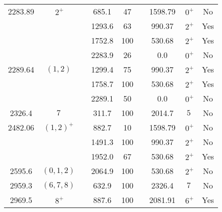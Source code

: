 \begin{tabular}{ccccccccc}
2283.89  & $~2^+$    &            &  685.1     &  47        &                  & 1598.79         & $~0^+$         & No                \\
         &           &            & 1293.6     &  63        &                  &  990.37         & $~2^+$         & Yes               \\
         &           &            & 1752.8     & 100        &                  &  530.68         & $~2^+$         & Yes               \\
         &           &            & 2283.9     &  26        &                  &    0.0          & $~0^+$         & No                \\
2289.64  & $(1,2)$   &            & 1299.4     &  75        &                  &  990.37         & $~2^+$         & Yes               \\
         &           &            & 1758.7     & 100        &                  &  530.68         & $~2^+$         & Yes               \\
         &           &            & 2289.1     &  50        &                  &    0.0          & $~0^+$         & No                \\
2326.4   & $7$       &            &  311.7     & 100        &                  & 2014.7          & $5$            & No                \\
2482.06  & $(1,2)^+$ &            &  882.7     &  10        &                  & 1598.79         & $~0^+$         & No                \\
         &           &            & 1491.3     & 100        &                  &  990.37         & $~2^+$         & No                \\
         &           &            & 1952.0     &  67        &                  &  530.68         & $~2^+$         & Yes               \\
2595.6   & $(0,1,2)$ &            & 2064.9     & 100        &                  &  530.68         & $~2^+$         & No                \\
2959.3   & $(6,7,8)$ &            &  632.9     & 100        &                  &  2326.4         & $7$            & No                \\
2969.5   & $~8^+$    &            &  887.6     & 100        &                  &  2081.91        & $~6^+$         & Yes               \\
\hline
\end{tabular}